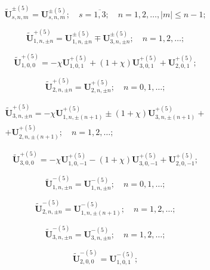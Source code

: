 \begin{equation}\label{eq:1:89a}
\mathbf{\tilde U}_{s,n,m}^{\pm(5)}=\mathbf{U}_{s,n,m}^{\pm(5)};\quad s=\overline{1,3};\quad n=1,2,\dots, |m|\le n-1;
\end{equation}

\begin{equation}\label{eq:1:90a}
\mathbf{\tilde U}_{1,n,\pm n}^{+(5)}=\mathbf{U}_{1,n,\pm n}^{\pm(5)}\mp\mathbf{U}_{3,n,\pm n}^{\pm(5)};\quad n=1,2,\dots;
\end{equation}

\begin{equation}\label{eq:1:91a}
\mathbf{\tilde U}_{1,0,0}^{+(5)}=-\chi\mathbf{U}_{1,0,1}^{+(5)}+(1+\chi)\mathbf{U}_{3,0,1}^{+(5)}+\mathbf{U}_{2,0,1}^{+(5)};
\end{equation}

\begin{equation}\label{eq:1:92a}
\mathbf{\tilde U}_{2,n,\pm n}^{+(5)}=\mathbf{U}_{2,n,\pm n}^{+(5)};\quad n=0,1,\dots;
\end{equation}

\begin{multline}\label{eq:1:93a}
\mathbf{\tilde U}_{3,n,\pm n}^{+(5)}=-\chi\mathbf{U}_{1,n,\pm (n+1)}^{+(5)}\pm(1+\chi)\mathbf{U}_{3,n,\pm (n+1)}^{+(5)}+ \\
+\mathbf{U}_{2,n,\pm (n+1)}^{+(5)};\quad n=1,2,\dots;
\end{multline}

\begin{equation}\label{eq:1:94a}
\mathbf{\tilde U}_{3,0,0}^{+(5)}=-\chi\mathbf{U}_{1,0,-1}^{+(5)}-(1+\chi)\mathbf{U}_{3,0,-1}^{+(5)}+\mathbf{U}_{2,0,-1}^{+(5)};
\end{equation}

\begin{equation}\label{eq:1:95a}
\mathbf{\tilde U}_{1,n,\pm n}^{-(5)}=\mathbf{U}_{1,n,\pm n}^{-(5)};\quad n=0,1,\dots;
\end{equation}

\begin{equation}\label{eq:1:96a}
\mathbf{\tilde U}_{2,n,\pm n}^{-(5)}=\mathbf{U}_{1,n,\pm (n+1)}^{-(5)};\quad n=1,2,\dots;
\end{equation}

\begin{equation}\label{eq:1:97a}
\mathbf{\tilde U}_{3,n,\pm n}^{-(5)}=\mathbf{U}_{3,n,\pm n}^{-(5)};\quad n=1,2,\dots;
\end{equation}

\begin{equation}\label{eq:1:98a}
\mathbf{\tilde U}_{2,0,0}^{-(5)}=\mathbf{U}_{1,0,1}^{-(5)};
\end{equation}

